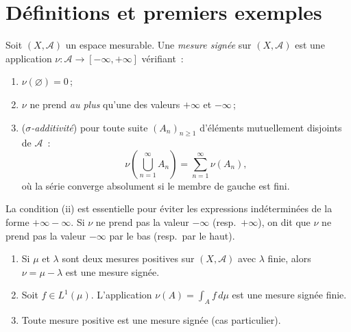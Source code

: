 \section{D\'efinitions et premiers exemples}

\begin{definition}
\label{def:mesure_signee}
Soit $(X, \mathcal{A})$ un espace mesurable. Une \emph{mesure sign\'ee}
sur $(X, \mathcal{A})$ est une application $\nu : \mathcal{A} \to [-\infty, +\infty]$
v\'erifiant~:
\begin{enumerate}
    \item[(i)] $\nu(\varnothing) = 0$\,;
    \item[(ii)] $\nu$ ne prend \emph{au plus} qu'une des valeurs $+\infty$ et $-\infty$\,;
    \item[(iii)] (\emph{$\sigma$-additivit\'e}) pour toute suite $(A_n)_{n \geq 1}$
    d'\'el\'ements mutuellement disjoints de $\mathcal{A}$~:
    \[
        \nu\!\left(\bigcup_{n=1}^{\infty} A_n\right)
        = \sum_{n=1}^{\infty} \nu(A_n),
    \]
    o\`u la s\'erie converge absolument si le membre de gauche est fini.
\end{enumerate}
\end{definition}

\begin{remarque}
La condition (ii) est essentielle pour \'eviter les expressions ind\'etermin\'ees de la
forme $+\infty - \infty$. Si $\nu$ ne prend pas la valeur $-\infty$ (resp.\ $+\infty$),
on dit que $\nu$ ne prend pas la valeur $-\infty$ par le bas (resp.\ par le haut).
\end{remarque}

\begin{exemple}
\begin{enumerate}
    \item Si $\mu$ et $\lambda$ sont deux mesures positives sur $(X, \mathcal{A})$
    avec $\lambda$ finie, alors $\nu = \mu - \lambda$ est une mesure sign\'ee.
    \item Soit $f \in L^1(\mu)$. L'application
    $\nu(A) = \int_A f\, d\mu$ est une mesure sign\'ee finie.
    \item Toute mesure positive est une mesure sign\'ee (cas particulier).
\end{enumerate}
\end{exemple}

